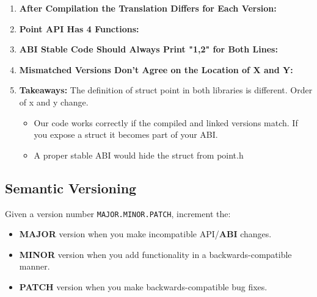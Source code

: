 \begin{example}
\begin{enumerate}
        \item \textbf{After Compilation the Translation Differs for Each Version:}
    
        \item \textbf{Point API Has 4 Functions:}
        
        \item \textbf{ABI Stable Code Should Always Print "1,2" for Both Lines:}

        \item \textbf{Mismatched Versions Don't Agree on the Location of X and Y:}
        
        \item \textbf{Takeaways:} The definition of struct point in both libraries is different. Order of x and y change. 
        \begin{itemize}
            \item Our code works correctly if the compiled and linked versions match. If you expose a struct it becomes part of your ABI.
            \item A proper stable ABI would hide the struct from point.h
        \end{itemize}
    \end{enumerate}
\end{example}

\subsection{Semantic Versioning}
\begin{definition}
    Given a version number \texttt{MAJOR.MINOR.PATCH}, increment the:
    \begin{itemize}
        \item \textbf{MAJOR} version when you make incompatible API/\textbf{ABI} changes.
        \item \textbf{MINOR} version when you add functionality in a backwards-compatible manner.
        \item \textbf{PATCH} version when you make backwards-compatible bug fixes.
    \end{itemize}
\end{definition}

